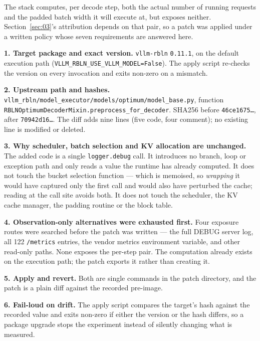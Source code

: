 The stack computes, per decode step, both the actual number of running requests and the padded batch width it will execute at, but exposes neither. Section~\ref{sec:03}'s attribution depends on that pair, so a patch was applied under a written policy whose seven requirements are answered here.

\textbf{1. Target package and exact version.} \texttt{vllm-rbln} \texttt{0.11.1}, on the default execution path (\texttt{VLLM\_\allowbreak{}RBLN\_\allowbreak{}USE\_\allowbreak{}VLLM\_\allowbreak{}MODEL=False}). The apply script re-checks the version on every invocation and exits non-zero on a mismatch.

\textbf{2. Upstream path and hashes.} \texttt{vllm\_\allowbreak{}rbln/\allowbreak{}model\_\allowbreak{}executor/\allowbreak{}models/\allowbreak{}optimum/\allowbreak{}model\_\allowbreak{}base.\allowbreak{}py}, function \texttt{RBLNOptimumDecoderMixin.\allowbreak{}preprocess\_\allowbreak{}for\_\allowbreak{}decoder}. SHA256 before \texttt{46ce1675\ldots{}}, after \texttt{70942d16\ldots{}}. The diff adds nine lines (five code, four comment); no existing line is modified or deleted.

\textbf{3. Why scheduler, batch selection and KV allocation are unchanged.} The added code is a single \texttt{logger.debug} call. It introduces no branch, loop or exception path and only reads a value the runtime has already computed. It does not touch the bucket selection function --- which is memoised, so \emph{wrapping} it would have captured only the first call and would also have perturbed the cache; reading at the call site avoids both. It does not touch the scheduler, the KV cache manager, the padding routine or the block table.

\textbf{4. Observation-only alternatives were exhausted first.} Four exposure routes were searched before the patch was written --- the full DEBUG server log, all 122 \texttt{/metrics} entries, the vendor metrics environment variable, and other read-only paths. None exposes the per-step pair. The computation already exists on the execution path; the patch exports it rather than creating it.

\textbf{5. Apply and revert.} Both are single commands in the patch directory, and the patch is a plain diff against the recorded pre-image.

\textbf{6. Fail-loud on drift.} The apply script compares the target's hash against the recorded value and exits non-zero if either the version or the hash differs, so a package upgrade stops the experiment instead of silently changing what is measured.

